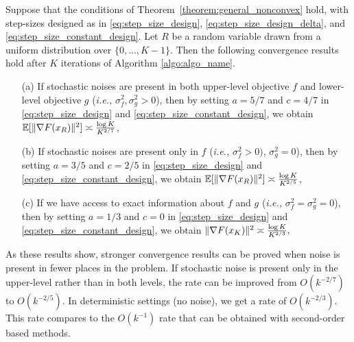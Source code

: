 \begin{corollary}
    \label{corollary:non_convex_F}
    Suppose that the conditions of Theorem~\ref{theorem:general_nonconvex} hold,  with step-sizes designed as in \eqref{eq:step_size_design}, \eqref{eq:step_size_design_delta}, and
    \eqref{eq:step_size_constant_design}. Let $R$ be a random variable drawn from a uniform distribution over $\{0, ..., K-1\}$. 
    Then the following convergence results hold after $K$ iterations of Algorithm \ref{algo:algo_name}.
    \begin{enumerate}
        \item[(a)]  If stochastic noises are present in both upper-level objective $f$ and lower-level objective $g$ ({\it i.e.,} $\sigma_f^2, \sigma_g^2 > 0$), then by setting $a=5/7$ and $c=4/7$ in \eqref{eq:step_size_design} and \eqref{eq:step_size_constant_design}, we obtain 
        $\mathbb{E}[\|\nabla F(x_R)\|^2] \asymp \frac{\log K}{K^{2/7}}$,
        \item[(b)] If stochastic noises are present only in $f$ ({\it i.e.,} $\sigma_f^2 > 0)$, $\sigma_g^2 = 0$), then by setting $a = 3/5$ and $c=2/5$ in \eqref{eq:step_size_design} and \eqref{eq:step_size_constant_design}, we obtain $\mathbb{E}[\|\nabla F(x_R)\|^2] \asymp \frac{\log K}{K^{2/5}}$,
        \item[(c)] If we have access to exact information about $f$ and $g$ ({\it i.e.,} $\sigma_f^2 = \sigma_g^2 = 0$), then by setting $a = 1/3$ and $c = 0$ in \eqref{eq:step_size_design} and \eqref{eq:step_size_constant_design}, we obtain $\|\nabla F(x_K)\|^2 \asymp \frac{\log K}{K^{2/3}},$
    \end{enumerate}
\end{corollary}
As these results show, stronger convergence results can be proved when noise is present in fewer places in the problem. 
If stochastic noise is present only in the upper-level rather than in both levels, the rate can be improved from $O(k^{-2/7})$ to $O(k^{-2/5})$. In deterministic settings (no noise), we get a rate of  $O(k^{-2/3})$. 
This rate compares to the $O(k^{-1})$ rate that can be obtained with second-order based methods. 







